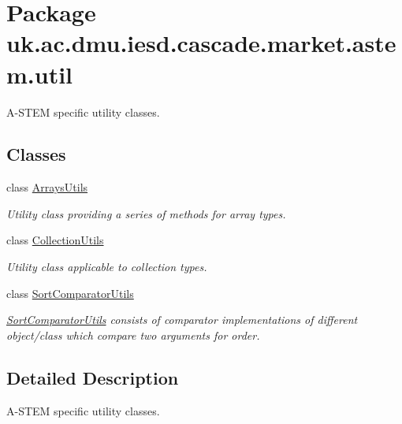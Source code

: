 \hypertarget{namespaceuk_1_1ac_1_1dmu_1_1iesd_1_1cascade_1_1market_1_1astem_1_1util}{\section{Package uk.\-ac.\-dmu.\-iesd.\-cascade.\-market.\-astem.\-util}
\label{namespaceuk_1_1ac_1_1dmu_1_1iesd_1_1cascade_1_1market_1_1astem_1_1util}
}


A-\/\-S\-T\-E\-M specific utility classes.  


\subsection*{Classes}
\begin{DoxyCompactItemize}
\item 
class \hyperlink{classuk_1_1ac_1_1dmu_1_1iesd_1_1cascade_1_1market_1_1astem_1_1util_1_1_arrays_utils}{Arrays\-Utils}
\begin{DoxyCompactList}\small\item\em Utility class providing a series of methods for array types. \end{DoxyCompactList}\item 
class \hyperlink{classuk_1_1ac_1_1dmu_1_1iesd_1_1cascade_1_1market_1_1astem_1_1util_1_1_collection_utils}{Collection\-Utils}
\begin{DoxyCompactList}\small\item\em Utility class applicable to collection types. \end{DoxyCompactList}\item 
class \hyperlink{classuk_1_1ac_1_1dmu_1_1iesd_1_1cascade_1_1market_1_1astem_1_1util_1_1_sort_comparator_utils}{Sort\-Comparator\-Utils}
\begin{DoxyCompactList}\small\item\em {\itshape \hyperlink{classuk_1_1ac_1_1dmu_1_1iesd_1_1cascade_1_1market_1_1astem_1_1util_1_1_sort_comparator_utils}{Sort\-Comparator\-Utils}} consists of comparator implementations of different object/class which compare two arguments for order. \end{DoxyCompactList}\end{DoxyCompactItemize}


\subsection{Detailed Description}
A-\/\-S\-T\-E\-M specific utility classes. 